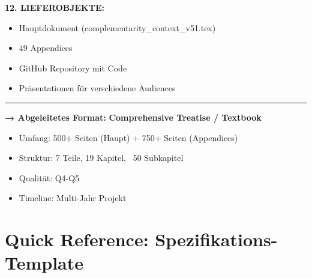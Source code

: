 \documentclass[12pt,a4paper]{article}
\begin{document}
\begin{tcolorbox}[colback=blue!5!white, colframe=blue!75!black, 
    title=EBF Hauptdokument: Vollständige Spezifikation]
\textbf{12. LIEFEROBJEKTE:}
\begin{itemize}[nosep]
\item Hauptdokument (complementarity\_context\_v51.tex)
\item 49 Appendices
\item GitHub Repository mit Code
\item Präsentationen für verschiedene Audiences
\end{itemize}

\rule{\textwidth}{0.5pt}

\textbf{→ Abgeleitetes Format:} \textbf{Comprehensive Treatise / Textbook}
\begin{itemize}[nosep]
\item Umfang: 500+ Seiten (Haupt) + 750+ Seiten (Appendices)
\item Struktur: 7 Teile, 19 Kapitel, ~50 Subkapitel
\item Qualität: Q4-Q5
\item Timeline: Multi-Jahr Projekt
\end{itemize}

\end{tcolorbox}


\section{Quick Reference: Spezifikations-Template}
\end{document}
